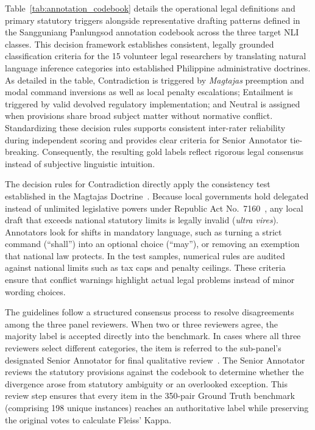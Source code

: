     Table~\ref{tab:annotation_codebook} details the operational legal definitions and primary statutory triggers alongside representative drafting patterns defined in the Sangguniang Panlungsod annotation codebook across the three target NLI classes. This decision framework establishes consistent, legally grounded classification criteria for the 15 volunteer legal researchers by translating natural language inference categories into established Philippine administrative doctrines. As detailed in the table, Contradiction is triggered by \textit{Magtajas} preemption and modal command inversions as well as local penalty escalations; Entailment is triggered by valid devolved regulatory implementation; and Neutral is assigned when provisions share broad subject matter without normative conflict. Standardizing these decision rules supports consistent inter-rater reliability during independent scoring and provides clear criteria for Senior Annotator tie-breaking. Consequently, the resulting gold labels reflect rigorous legal consensus instead of subjective linguistic intuition.

    The decision rules for Contradiction directly apply the consistency test established in the Magtajas Doctrine~\cite{scp1994magtajasvpryce}. Because local governments hold delegated instead of unlimited legislative powers under Republic Act No.~7160~\cite{philgov1991ra7160}, any local draft that exceeds national statutory limits is legally invalid (\textit{ultra vires}). Annotators look for shifts in mandatory language, such as turning a strict command (``shall'') into an optional choice (``may''), or removing an exemption that national law protects. In the test samples, numerical rules are audited against national limits such as tax caps and penalty ceilings. These criteria ensure that conflict warnings highlight actual legal problems instead of minor wording choices.

    The guidelines follow a structured consensus process to resolve disagreements among the three panel reviewers. When two or three reviewers agree, the majority label is accepted directly into the benchmark. In cases where all three reviewers select different categories, the item is referred to the sub-panel's designated Senior Annotator for final qualitative review~\cite{gao2022hierarchical}. The Senior Annotator reviews the statutory provisions against the codebook to determine whether the divergence arose from statutory ambiguity or an overlooked exception. This review step ensures that every item in the 350-pair Ground Truth benchmark (comprising 198 unique instances) reaches an authoritative label while preserving the original votes to calculate Fleiss' Kappa.

